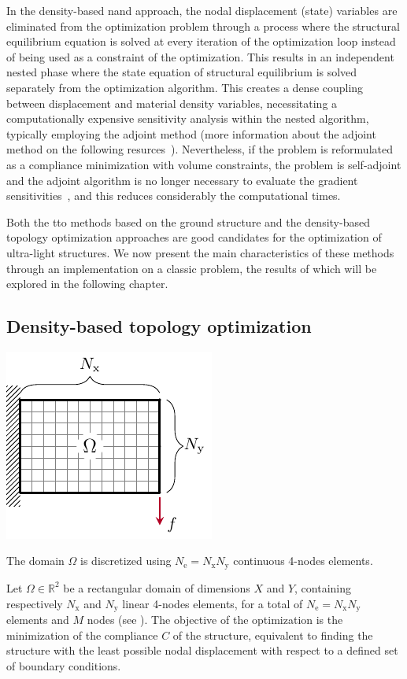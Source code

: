 In the density-based \acrfull{nand} approach, the nodal displacement (state) variables are eliminated from the optimization problem through a process where the structural equilibrium equation is solved at every iteration of the optimization loop instead of being used as a constraint of the optimization. This results in an independent nested phase where the state equation of structural equilibrium is solved separately from the optimization algorithm. This creates a dense coupling between displacement and material density variables, necessitating a computationally expensive sensitivity analysis within the nested algorithm, typically employing the adjoint method (more information about the adjoint method on the following resurces~). Nevertheless, if the problem is reformulated as a compliance minimization with volume constraints, the problem is self-adjoint and the adjoint algorithm is no longer necessary to evaluate the gradient sensitivities~, and this reduces considerably the computational times.

Both the \gls{tto} methods based on the ground structure and the density-based topology optimization approaches are good candidates for the optimization of ultra-light structures. We now present the main characteristics of these methods through an implementation on a classic problem, the results of which will be explored in the following chapter.

\subsection{Density-based topology optimization}

\begin{marginfigure}
    \centering
    \includegraphics{figures/02_literature/01_contin_mesh/c_mesh.pdf}
    \caption{The domain $\Omega$ is discretized using $N_\text{e}=N_\text{x} N_\text{y}$ continuous 4-nodes elements.}
    \label{fig:02_mesh_c}
\end{marginfigure}
Let $\Omega \in \mathbb{R}^2$ be a rectangular domain of dimensions $X$ and $Y$, containing respectively $N_\text{x}$ and $N_\text{y}$ linear 4-nodes elements, for a total of $N_\text{e}=N_\text{x} N_\text{y}$ elements and $M$ nodes (see ). The objective of the optimization is the minimization of the compliance $C$ of the structure, equivalent to finding the structure with the least possible nodal displacement with respect to a defined set of boundary conditions. 

